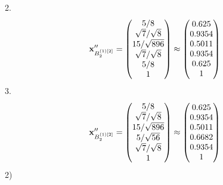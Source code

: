 \documentclass[10pt,a4paper]{article}
\begin{document}
	2.
	\[
		\bold{x}''_{B_2^{(1)[2]}} = 
		\begin{pmatrix}
			{{5}} / {{8}} \\
			{\sqrt{7}} / {\sqrt{8}} \\
			{{15}} / {\sqrt{896}} \\
			{\sqrt{7}} / {\sqrt{8}} \\
			{{5}} / {{8}} \\
			{1}{} \\
		\end{pmatrix}
		\approx
		\begin{pmatrix}
			0.625    \\
			0.9354   \\
			0.5011   \\
			0.9354   \\
			0.625    \\
			1        \\
		\end{pmatrix}
	\]
	3.
	\[
		\bold{x}''_{B_2^{(1)[2]}} = 
		\begin{pmatrix}
			{{5}} / {{8}} \\
			{\sqrt{7}} / {\sqrt{8}} \\
			{{15}} / {\sqrt{896}} \\
			{{5}} / {\sqrt{56}} \\
			{\sqrt{7}} / {\sqrt{8}} \\
			{1}{} \\
		\end{pmatrix}
		\approx
		\begin{pmatrix}
			0.625    \\
			0.9354   \\
			0.5011   \\
			0.6682   \\
			0.9354   \\
			1        \\
		\end{pmatrix}
	\]
	2)
\end{document}
